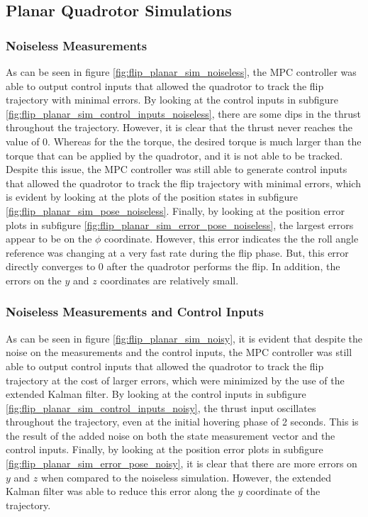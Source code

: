 \documentclass{thesisreport}
\begin{document}
\subsection{Planar Quadrotor Simulations}

\subsubsection*{Noiseless Measurements}

As can be seen in figure \ref{fig:flip_planar_sim_noiseless}, the MPC controller was able to output control inputs that allowed the quadrotor to track the flip trajectory with minimal errors. By looking at the control inputs in subfigure \ref{fig:flip_planar_sim_control_inputs_noiseless}, there are some dips in the thrust throughout the trajectory. However, it is clear that the thrust never reaches the value of 0. Whereas for the the torque, the desired torque is much larger than the torque that can be applied by the quadrotor, and it is not able to be tracked. Despite this issue, the MPC controller was still able to generate control inputs that allowed the quadrotor to track the flip trajectory with minimal errors, which is evident by looking at the plots of the position states in subfigure \ref{fig:flip_planar_sim_pose_noiseless}. Finally, by looking at the position error plots in subfigure \ref{fig:flip_planar_sim_error_pose_noiseless}, the largest errors appear to be on the $\phi$ coordinate. However, this error indicates the the roll angle reference was changing at a very fast rate during the flip phase. But, this error directly converges to 0 after the quadrotor performs the flip. In addition, the errors on the $y$ and $z$ coordinates are relatively small. 

\subsubsection*{Noiseless Measurements and Control Inputs}
As can be seen in figure \ref{fig:flip_planar_sim_noisy}, it is evident that despite the noise on the measurements and the control inputs, the MPC controller was still able to output control inputs that allowed the quadrotor to track the flip trajectory at the cost of larger errors, which were minimized by the use of the extended Kalman filter. By looking at the control inputs in subfigure \ref{fig:flip_planar_sim_control_inputs_noisy}, the thrust input oscillates throughout the trajectory, even at the initial hovering phase of 2 seconds. This is the result of the added noise on both the state measurement vector and the control inputs. Finally, by looking at the position error plots in subfigure \ref{fig:flip_planar_sim_error_pose_noisy}, it is clear that there are more errors on $y$ and $z$ when compared to the noiseless simulation. However, the extended Kalman filter was able to reduce this error along the $y$ coordinate of the trajectory.
\end{document}
